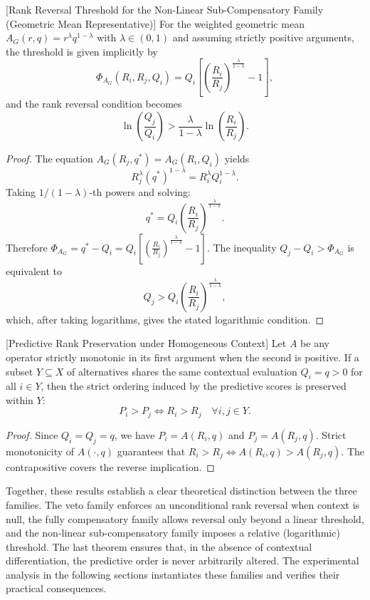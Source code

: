 \documentclass[mathematics,article,submit,moreauthors]{Definitions/mdpi}
\begin{document}
\begin{Corollary}{\color{red}[Rank Reversal Threshold for the Non-Linear Sub-Compensatory Family (Geometric Mean Representative)]}
\label{cor:geom_reversal}
{\color{red}
For the weighted geometric mean $A_G(r,q)=r^\lambda q^{1-\lambda}$ with $\lambda\in(0,1)$ and assuming strictly positive arguments, the threshold is given implicitly by
\[
\Phi_{A_G}(R_i,R_j,Q_i)=Q_i\left[\left(\frac{R_i}{R_j}\right)^{\frac{\lambda}{1-\lambda}} - 1\right],
\]
and the rank reversal condition becomes
\[
\ln\left(\frac{Q_j}{Q_i}\right) > \frac{\lambda}{1-\lambda} \ln\left(\frac{R_i}{R_j}\right).
\]
}
\end{Corollary}

{\color{red}
\begin{proof}
The equation $A_G(R_j, q^*) = A_G(R_i, Q_i)$ yields
\[
R_j^\lambda (q^*)^{1-\lambda} = R_i^\lambda Q_i^{1-\lambda}.
\]
Taking $1/(1-\lambda)$-th powers and solving:
\[
q^* = Q_i \left(\frac{R_i}{R_j}\right)^{\frac{\lambda}{1-\lambda}}.
\]
Therefore $\Phi_{A_G}=q^*-Q_i = Q_i\left[\left(\frac{R_i}{R_j}\right)^{\frac{\lambda}{1-\lambda}} - 1\right]$. The inequality $Q_j - Q_i > \Phi_{A_G}$ is equivalent to
\[
Q_j > Q_i \left(\frac{R_i}{R_j}\right)^{\frac{\lambda}{1-\lambda}},
\]
which, after taking logarithms, gives the stated logarithmic condition.
\end{proof}
}

\begin{Theorem}{\color{red}[Predictive Rank Preservation under Homogeneous Context]}
\label{thm:homog_preserv}
{\color{red}
Let $A$ be any operator strictly monotonic in its first argument when the second is positive. If a subset $Y\subseteq X$ of alternatives shares the same contextual evaluation $Q_i=q>0$ for all $i\in Y$, then the strict ordering induced by the predictive scores is preserved within $Y$:
\[
P_i > P_j \iff R_i > R_j \quad \forall i,j\in Y.
\]
}
\end{Theorem}

{\color{red}
\begin{proof}
Since $Q_i=Q_j=q$, we have $P_i=A(R_i,q)$ and $P_j=A(R_j,q)$. Strict monotonicity of $A(\cdot,q)$ guarantees that $R_i>R_j \iff A(R_i,q)>A(R_j,q)$. The contrapositive covers the reverse implication.
\end{proof}
}

{\color{red}
Together, these results establish a clear theoretical distinction between the three families. The veto family enforces an unconditional rank reversal when context is null, the fully compensatory family allows reversal only beyond a linear threshold, and the non-linear sub-compensatory family imposes a relative (logarithmic) threshold. The last theorem ensures that, in the absence of contextual differentiation, the predictive order is never arbitrarily altered. The experimental analysis in the following sections instantiates these families and verifies their practical consequences.
} 
 
\end{document}
